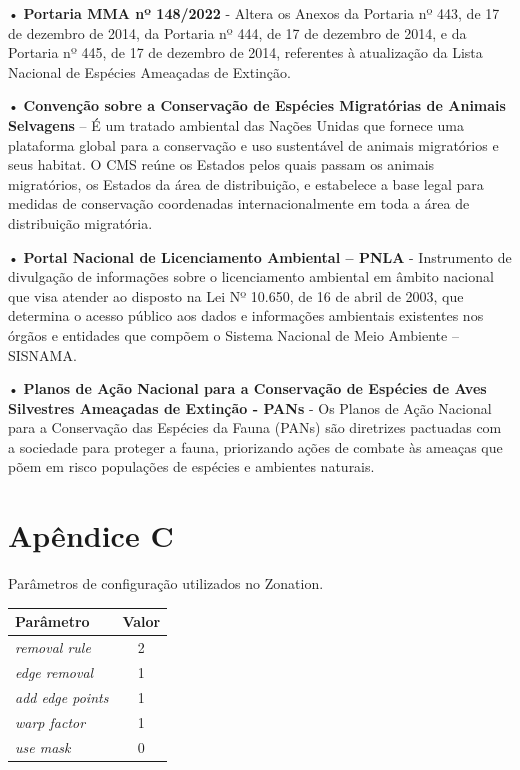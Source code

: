 \documentclass[
  oneside]{scrbook}
\begin{document}
• \textbf{Portaria MMA nº 148/2022} - Altera os Anexos da Portaria nº 443, de 17 de dezembro de 2014, da Portaria nº 444, de 17 de dezembro de 2014, e da Portaria nº 445, de 17 de dezembro de 2014, referentes à atualização da Lista Nacional de Espécies Ameaçadas de Extinção.

• \textbf{Convenção sobre a Conservação de Espécies Migratórias de Animais Selvagens} -- É um tratado ambiental das Nações Unidas que fornece uma plataforma global para a conservação e uso sustentável de animais migratórios e seus habitat. O CMS reúne os Estados pelos quais passam os animais migratórios, os Estados da área de distribuição, e estabelece a base legal para medidas de conservação coordenadas internacionalmente em toda a área de distribuição migratória.

• \textbf{Portal Nacional de Licenciamento Ambiental -- PNLA} - Instrumento de divulgação de informações sobre o licenciamento ambiental em âmbito nacional que visa atender ao disposto na Lei Nº 10.650, de 16 de abril de 2003, que determina o acesso público aos dados e informações ambientais existentes nos órgãos e entidades que compõem o Sistema Nacional de Meio Ambiente -- SISNAMA.

• \textbf{Planos de Ação Nacional para a Conservação de Espécies de Aves Silvestres Ameaçadas de Extinção - PANs} - Os Planos de Ação Nacional para a Conservação das Espécies da Fauna (PANs) são diretrizes pactuadas com a sociedade para proteger a fauna, priorizando ações de combate às ameaças que põem em risco populações de espécies e ambientes naturais.

\hypertarget{apendiceC}{%
\chapter*{Apêndice C}\label{apendiceC}}


\pagestyle{headings}

Parâmetros de configuração utilizados no Zonation.

\begin{longtable}[t]{>{}lc}
\toprule
Parâmetro & Valor\\
\midrule
\em{removal rule} & 2\\
\em{edge removal} & 1\\
\em{add edge points} & 1\\
\em{warp factor} & 1\\
\em{use mask} & 0\\
\bottomrule
\end{longtable}

  
\end{document}
